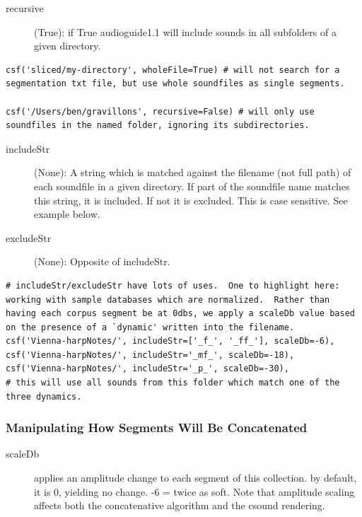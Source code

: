 \documentclass{article}
\newcommand{\ag}{audioguide1.1 }
\begin{document}
\begin{spacing}{1.2}
\begin{description}
\item[recursive] (True): if True \ag will include sounds in all subfolders of a given directory.
\end{description}

\begin{lstlisting}
csf('sliced/my-directory', wholeFile=True) # will not search for a segmentation txt file, but use whole soundfiles as single segments.

csf('/Users/ben/gravillons', recursive=False) # will only use soundfiles in the named folder, ignoring its subdirectories.
\end{lstlisting}

\begin{description}
\item[includeStr] (None): A string which is matched against the filename (not full path) of each soundfile in a given directory.  If part of the soundfile name matches this string, it is included.  If not it is excluded.  This is case sensitive.  See example below.

\item[excludeStr] (None): Opposite of includeStr.
\end{description}

\begin{lstlisting}
# includeStr/excludeStr have lots of uses.  One to highlight here: working with sample databases which are normalized.  Rather than having each corpus segment be at 0dbs, we apply a scaleDb value based on the presence of a `dynamic' written into the filename.
csf('Vienna-harpNotes/', includeStr=['_f_', '_ff_'], scaleDb=-6),
csf('Vienna-harpNotes/', includeStr='_mf_', scaleDb=-18),
csf('Vienna-harpNotes/', includeStr='_p_', scaleDb=-30),
# this will use all sounds from this folder which match one of the three dynamics.
\end{lstlisting}





\subsubsection{Manipulating How Segments Will Be Concatenated}
\begin{description}
\item[scaleDb] applies an amplitude change to each segment of this collection. by default, it is 0, yielding no change. -6 = twice as soft.  Note that amplitude scaling affects both the concatenative algorithm and the csound rendering.  


\end{description}
\end{spacing}
\end{document}
